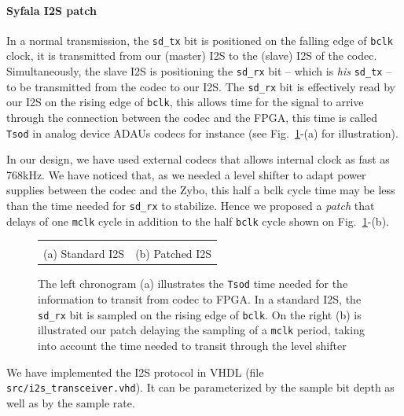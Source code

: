 \documentclass[11pt]{article}
\numberwithin{equation}{section}
\numberwithin{figure}{section}
\begin{document}
\paragraph{Syfala I2S patch} In a normal transmission, the {\tt sd\_tx} bit is positioned on the falling edge of {\tt bclk} clock, it is transmitted from our (master) I2S to the (slave) I2S of the codec. Simultaneously, the slave I2S is positioning the {\tt sd\_rx} bit -- which is {\em his} {\tt sd\_tx} -- to be transmitted from the codec to our I2S. The {\tt sd\_rx} bit is effectively read by our I2S on the rising edge of {\tt bclk}, this allows time for the signal to arrive through the connection between the codec and the FPGA, this time is called {\tt Tsod} in analog device ADAUs codecs for instance (see Fig.~\ref{figi2szoom2}-(a) for illustration).  

In our design, we have used external codecs that allows internal clock as fast as 768kHz. We have noticed that, as we needed a level shifter to adapt power supplies between the codec and the Zybo, this  half a bclk cycle time may be less than the time needed for {\tt sd\_rx} to stabilize. Hence we proposed a {\em patch} that delays of one  {\tt mclk} cycle in addition to the half {\tt bclk} cycle shown on Fig.~\ref{figi2szoom2}-(b).

\begin{figure}[ht]
  \begin{tabular}{cc}
    \begin{boxedminipage}{0.5\textwidth}
      
      \end{boxedminipage} &
    \begin{boxedminipage}{0.5\textwidth}
      
            \end{boxedminipage}\\
  (a) Standard I2S & (b) Patched I2S \\
  \end{tabular}
  \caption{The left chronogram (a) illustrates the {\tt Tsod} time needed for the information to transit from codec to FPGA. In a standard I2S, the {\tt sd\_rx} bit is sampled on the rising edge of {\tt bclk}. On the right (b) is illustrated our patch delaying the sampling of a {\tt mclk} period, taking into account the time needed to transit through the level shifter}
  \label{figi2szoom2}
\end{figure}

We have implemented the I2S protocol in VHDL (file {\tt src/i2s\_transceiver.vhd}). It can be parameterized by the  sample bit depth as well as by the sample rate.  
\end{document}
